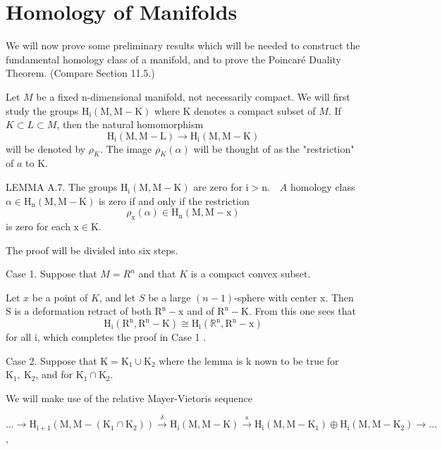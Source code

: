 \documentclass[10pt]{article}
\begin{document}
\section{Homology of Manifolds}
We will now prove some preliminary results which will be needed to construct the fundamental homology class of a manifold, and to prove the Poincaré Duality Theorem. (Compare Section 11.5.)

Let $M$ be a fixed n-dimensional manifold, not necessarily compact. We will first study the groups $\mathrm{H}_{\mathrm{i}}(\mathrm{M}, \mathrm{M}-\mathrm{K})$ where $\mathrm{K}$ denotes a compact subset of $M$. If $K \subset L \subset M$, then the natural homomorphism
$$
\mathrm{H}_{\mathrm{i}}(\mathrm{M}, \mathrm{M}-\mathrm{L}) \rightarrow \mathrm{H}_{\mathrm{i}}(\mathrm{M}, \mathrm{M}-\mathrm{K})
$$
will be denoted by $\rho_{K}$. The image $\rho_{K}(\alpha)$ will be thought of as the "restriction" of $a$ to $\mathrm{K}$.

LEMMA A.7. The groups $\mathrm{H}_{\mathrm{i}}(\mathrm{M}, \mathrm{M}-\mathrm{K})$ are zero for $\mathrm{i}>\mathrm{n} . \quad A$ homology class $\alpha \in \mathrm{H}_{\mathrm{n}}(\mathrm{M}, \mathrm{M}-\mathrm{K})$ is zero if and only if the restriction
$$
\rho_{\mathrm{x}}(\alpha) \in \mathrm{H}_{\mathrm{n}}(\mathrm{M}, \mathrm{M}-\mathrm{x})
$$
is zero for each $\mathrm{x} \in \mathrm{K}$.

The proof will be divided into six steps.

Case 1. Suppose that $M=R^{n}$ and that $K$ is a compact convex subset.

Let $x$ be a point of $K$, and let $S$ be a large $(n-1)$-sphere with center $\mathrm{x}$. Then $\mathrm{S}$ is a deformation retract of both $\mathrm{R}^{\mathrm{n}}-\mathrm{x}$ and of $\mathrm{R}^{\mathrm{n}}-\mathrm{K}$. From this one sees that
$$
\mathrm{H}_{\mathrm{i}}\left(\mathrm{R}^{\mathrm{n}}, \mathrm{R}^{\mathrm{n}}-\mathrm{K}\right) \stackrel{ }{\cong} \mathrm{H}_{\mathrm{i}}\left(\mathbb{R}^{\mathrm{n}}, \mathrm{R}^{\mathrm{n}}-\mathrm{x}\right)
$$
for all $\mathrm{i}$, which completes the proof in Case 1 .

Case 2. Suppose that $\mathrm{K}=\mathrm{K}_{1} \cup \mathrm{K}_{2}$ where the lemma is $\mathrm{k}$ nown to be true for $\mathrm{K}_{1}, \mathrm{~K}_{2}$, and for $\mathrm{K}_{1} \cap \mathrm{K}_{2}$.

We will make use of the relative Mayer-Vietoris sequence

$\ldots \rightarrow \mathrm{H}_{\mathrm{i}+1}\left(\mathrm{M}, \mathrm{M}-\left(\mathrm{K}_{1} \cap \mathrm{K}_{2}\right)\right) \stackrel{\delta}{\rightarrow} \mathrm{H}_{\mathrm{i}}(\mathrm{M}, \mathrm{M}-\mathrm{K}) \stackrel{\mathrm{s}}{\rightarrow} \mathrm{H}_{\mathrm{i}}\left(\mathrm{M}, \mathrm{M}-\mathrm{K}_{1}\right) \oplus \mathrm{H}_{\mathrm{i}}\left(\mathrm{M}, \mathrm{M}-\mathrm{K}_{2}\right) \rightarrow \ldots$,
\end{document}
